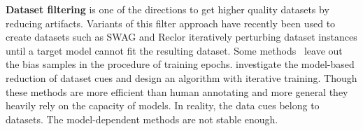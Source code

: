  
\textbf{Dataset filtering} is one of the directions to get higher quality datasets by reducing artifacts. 
Variants of this filter approach have recently
been used to create datasets such as SWAG and Reclor 
iteratively perturbing dataset instances until a target 
model cannot fit the resulting dataset. Some methods~\cite{yaghoobzadeh2019robust} 
leave out the bias samples in the procedure of training epochs. \cite{bras2020adversarial} 
investigate the model-based reduction of dataset cues and design an algorithm with iterative training. 
Though these methods are more efficient than human annotating and more general 
they heavily rely on the capacity of models. In reality, the data cues belong to datasets. The 
model-dependent methods are not stable enough.








